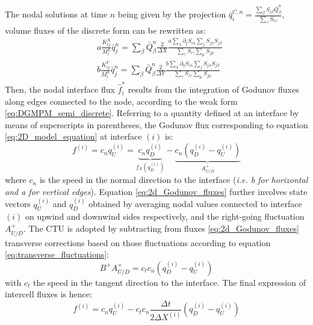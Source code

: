The nodal solutions at time $n$ being given by the projection $\bar{q}^{C,n}_i=\frac{\sum_\beta S_{i\beta}\bar{Q}^n_\beta}{\sum_\gamma S_{i\gamma}}$, volume fluxes of the discrete form can be rewritten as:
\begin{equation}
  \label{eq:2Dvolume_fluxes}
  \begin{aligned}
    & a\frac{K_{ij}^X}{M_i^L}\bar{q}^n_j  = \sum_\beta \bar{Q}^n_\beta \frac{2}{\Delta X} \frac{a\sum_\lambda\partial_\xi S_{i\lambda}  \sum_j S_{j\lambda} S_{j\beta}}{\sum_\gamma  S_{i\gamma}\sum_\mu S_{j\mu}}\\
    & b\frac{K_{ij}^Y}{M_i^L}\bar{q}^n_j = \sum_\beta \bar{Q}^n_\beta\frac{2}{\Delta Y}  \frac{b \sum_\lambda\partial_\eta S_{i\lambda}  \sum_j S_{j\lambda} S_{j\beta}}{\sum_\gamma  S_{i\gamma}\sum_\mu S_{j\mu}}
  \end{aligned}
\end{equation}
Then, the nodal interface flux $\hat{f}_i^{*}$ results from the integration of Godunov fluxes along edges connected to the node, according to the weak form \eqref{eq:DGMPM_semi_discrete}.
Referring to a quantity defined at an interface by means of superscripts in parentheses, the Godunov flux corresponding to equation \eqref{eq:2D_model_equation} at interface $(i)$ is:
\begin{equation}
  \label{eq:2d_Godunov_fluxes}
  f^{(i)}= c_n q^{(i)}_U = \underbrace{c_nq^{(i)}_D}_{f_N(q^{(i)}_D)} - \underbrace{c_n (q^{(i)}_D -q^{(i)}_U)}_{A^{+}_{U/D}} 
\end{equation}
where $c_n$ is the speed in the normal direction to the interface (\textit{i.e. b for horizontal and a for vertical edges}). Equation \eqref{eq:2d_Godunov_fluxes} further involves state vectors $q^{(i)}_U$ and $q^{(i)}_D$ obtained by averaging nodal values connected to interface $(i)$ on upwind and downwind sides respectively, and the right-going fluctuation $A_{U/D}^+$.
The CTU is adopted by subtracting from fluxes \eqref{eq:2d_Godunov_fluxes} transverse corrections based on those fluctuations according to equation \eqref{eq:transverse_fluctuations}:
\begin{equation}
  \label{eq:2D_transverse_corrections}
  B^+A^+_{U/D}=c_t c_n (q^{(i)}_D -q^{(i)}_U)
\end{equation}
with $c_t$ the speed in the tangent direction to the interface. The final expression of intercell fluxes is hence:
\begin{equation}
  \label{eq:CTU-fluxes}
  f^{(i)}= c_n q^{(i)}_U - c_t c_n \frac{\Delta t}{2\Delta X^{(i)}}(q^{(i)}_D -q^{(i)}_U)
\end{equation}
